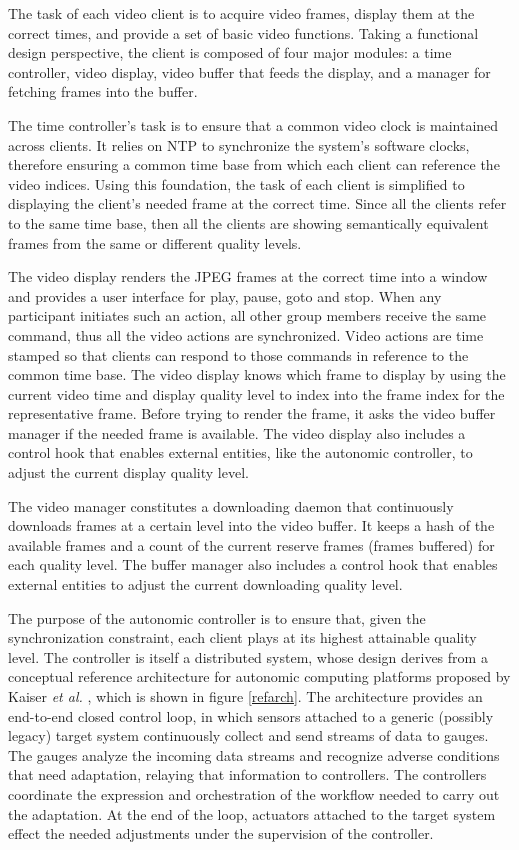 \documentclass{sig-alternate}
\begin{document}

The task of each video client is to acquire video frames, display them
at the correct times, and provide a set of basic video functions.
Taking a functional design perspective, the client is composed of four
major modules: a time controller, video display, video buffer that
feeds the display, and a manager for fetching frames into the buffer.

The time controller's task is to ensure that a common video clock is
maintained across clients.  It relies on NTP to synchronize the
system's software clocks, therefore ensuring a common time base from
which each client can reference the video indices.  Using this
foundation, the task of each client is simplified to displaying the
client's needed frame at the correct time.  Since all the clients
refer to the same time base, then all the clients are showing
semantically equivalent frames from the same or different quality
levels.

The video display renders the JPEG frames at the correct time into a
window and provides a user interface for play, pause, goto and stop.
When any participant initiates such an action, all other group members
receive the same command, thus all the video actions are synchronized.
Video actions are time stamped so that clients can respond to those
commands in reference to the common time base.  The video display
knows which frame to display by using the current video time and
display quality level to index into the frame index for the
representative frame.  Before trying to render the frame, it asks the
video buffer manager if the needed frame is available.  The video
display also includes a control hook that enables external entities,
like the autonomic controller, to adjust the current display quality
level.

The video manager constitutes a downloading daemon that continuously
downloads frames at a certain level into the video buffer.  It keeps a
hash of the available frames and a count of the current reserve frames
(frames buffered) for each quality level.  The buffer manager also
includes a control hook that enables external entities to adjust the
current downloading quality level.


The purpose of the autonomic controller is to ensure that, given the
synchronization constraint, each client plays at its highest
attainable quality level.  The controller is itself a distributed
system, whose design derives from a conceptual reference architecture
for autonomic computing platforms proposed by Kaiser {\it et al.}
\cite{REFARCH}, which is shown in figure \ref{refarch}. The
architecture provides an end-to-end closed control loop, in which
sensors attached to a generic (possibly legacy) target system
continuously collect and send streams of data to gauges.  The gauges
analyze the incoming data streams and recognize adverse conditions
that need adaptation, relaying that information to controllers.  The
controllers coordinate the expression and orchestration of the
workflow needed to carry out the adaptation.  At the end of the loop,
actuators attached to the target system effect the needed adjustments
under the supervision of the controller.
\end{document}
